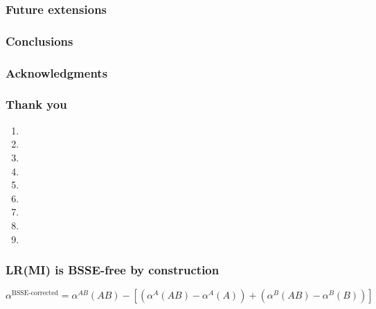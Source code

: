 \documentclass[%
    xcolor=usenames,dvipsnames,svgnames%
]{beamer}
\begin{document}
\begin{frame}
  \frametitle{Future extensions}
\end{frame}

\begin{frame}
  \frametitle{Conclusions}
\end{frame}

\begin{frame}
  \frametitle{Acknowledgments}
\end{frame}

\begin{frame}
  \frametitle{Thank you}
  \scriptsize
  \begin{enumerate}
  \item {}
  \item {}
  \item {}
  \item {}
  \item {}
  \item {}
  \item {}
  \item {}
  \item {}
  \end{enumerate}
\end{frame}

\appendix

\begin{frame}
  \frametitle{LR(MI) is BSSE-free by construction}
  \begin{equation*}
    \alpha^{\text{BSSE-corrected}} = \alpha^{AB}(AB) - \left[ \left( \alpha^{A}(AB) - \alpha^{A}(A) \right) + \left( \alpha^{B}(AB) - \alpha^{B}(B) \right) \right]
    \label{eq:bsse-corrected-polarizability}
  \end{equation*}
\end{frame}
\end{document}
